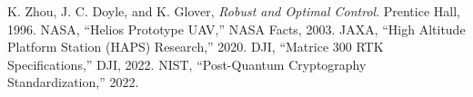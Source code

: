 \documentclass[conference]{IEEEtran}
\begin{document}

\begin{thebibliography}{99}
 K. Zhou, J. C. Doyle, and K. Glover, \emph{Robust and Optimal Control}. Prentice Hall, 1996.
 NASA, ``Helios Prototype UAV,'' NASA Facts, 2003.
 JAXA, ``High Altitude Platform Station (HAPS) Research,'' 2020.
 DJI, ``Matrice 300 RTK Specifications,'' DJI, 2022.
 NIST, ``Post-Quantum Cryptography Standardization,'' 2022.
\end{thebibliography}
\end{document}
